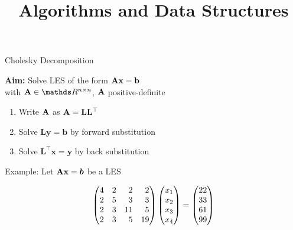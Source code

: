 \documentclass[11pt,compress,t,notes=noshow, xcolor=table]{beamer}
\title{Algorithms and Data Structures}
\begin{document}


\begin{vbframe}{Cholesky Decomposition}

\textbf{Aim:} Solve LES of the form $\mathbf{A} \mathbf{x} = \mathbf{b}$\\
\medskip
with $\Amat \in \R^{n \times n}$, $\mathbf{A}$ positive-definite
\medskip
\begin{enumerate}
\item Write $\mathbf{A}$ as $\mathbf{A} = \mathbf{L}\mathbf{L}^\top$\\
\item Solve $\mathbf{Ly} = \mathbf{b}$ by forward substitution
\item Solve $\mathbf{L}^\top \mathbf{x}=\mathbf{y}$ by back substitution
\framebreak
\end{enumerate}

Example:
Let $\mathbf{A} \mathbf{x} = \boldsymbol{b}$ be a LES

$$
\begin{pmatrix*}[r]
4 & 2 & 2 & 2\\
2 & 5 & 3 & 3 \\
2 & 3 & 11&5\\
2 & 3 & 5 & 19\end{pmatrix*}
\mat{
x_1 \\ x_2 \\ x_3\\ x_4
\end{pmatrix} = \begin{pmatrix}
22 \\ 33 \\ 61 \\ 99 }
$$

\end{vbframe}
\end{document}
